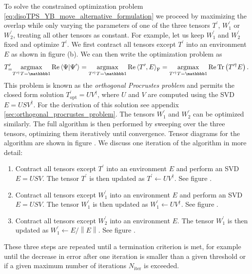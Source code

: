 To solve the constrained optimization problem \eqref{eq:disoTPS_YB_move_alternative_formulation} we proceed by maximizing the overlap while only varying the parameters of one of the three tensors $T^\prime$, $W_1^\prime$ or $W_2^\prime$, treating all other tensors as constant. For example, let us keep $W_1^\prime$ and $W_2^\prime$ fixed and optimize $T^\prime$. We first contract all tensors except $T^\prime$ into an environment $E$ as shown in figure (b). We can then write the optimization problem as
\begin{equation}
	T^\prime_\text = \underset{T^{\prime\dagger}T = \id}{\argmax} \Re\left\langle\Psi\middle|\Psi^\prime\right\rangle = \underset{T^{\prime\dagger}T = \id}{\argmax}\Re\left\langle T^\prime, E\right\rangle_\text{F} = \underset{T^{\prime\dagger}T = \id}{\argmax}\Re\Tr\left(T^{\prime\dagger}E\right).
\end{equation}
This problem is known as the \textit{orthogonal Procrustes problem} and permits the closed form solution $T^\prime_\text{opt} = UV^\dagger$, where $U$ and $V$ are computed using the SVD $E = USV^\dagger$. For the derivation of this solution see appendix \ref{sec:orthogonal_procrustes_problem}. The tensors $W_1^\prime$ and $W_2^\prime$ can be optimized similarly. The full algorithm is then performed by sweeping over the three tensors, optimizing them iteratively until convergence. Tensor diagrams for the algorithm are shown in figure . We discuss one iteration of the algorithm in more detail:
\begin{enumerate}
	\item Contract all tensors except $T^\prime$ into an environment $E$ and perform an SVD $E = USV$. The tensor $T^\prime$ is then updated as $T^\prime\leftarrow UV^\dagger$. See figure .
	\item Contract all tensors except $W_1^\prime$ into an environment $E$ and perform an SVD $E = USV$. The tensor $W_1^\prime$ is then updated as $W_1^\prime\leftarrow UV^\dagger$. See figure .
	\item Contract all tensors except $W_2^\prime$ into an environment $E$. The tensor $W_1^\prime$ is then updated as $W_1^\prime\leftarrow E/\left\lVert E\right\rVert$. See figure .
\end{enumerate}
These three steps are repeated until a termination criterion is met, for example until the decrease in error after one iteration is smaller than a given threshold or if a given maximum number of iterations $N_\text{iter}$ is exceeded. \par
